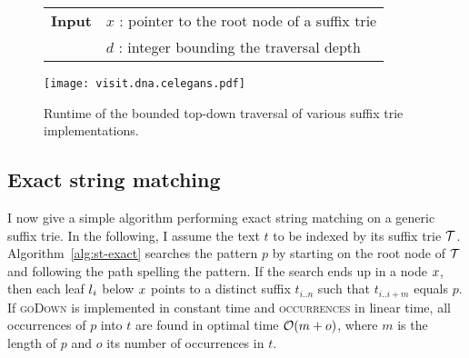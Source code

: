 \begin{figure*}[t]
\begin{center}
\begin{minipage}[t]{.7\textwidth}
\begin{algorithm}[H]
\begin{tabular}{ll}
\textbf{Input}  & $x$ : pointer to the root node of a suffix trie\\
 			    & $d$ : integer bounding the traversal depth\\
\end{tabular}
\begin{algorithmic}[1]
		\Repeat
			\State {}
		\Until {}
	\EndIf
\EndIf
\end{algorithmic}
\label{alg:st-dfs}
\end{algorithm}
\end{minipage}
\end{center}
\end{figure*}

\begin{figure}[b]
\begin{center}
\caption[Top-down traversal runtime]{Runtime of the bounded top-down traversal of various suffix trie implementations.}
\label{fig:visit-dna}
\texttt{[image: visit.dna.celegans.pdf]}
\end{center}
\end{figure}

\subsection{Exact string matching}
\label{sec:index:algo:exact}

I now give a simple algorithm performing exact string matching on a generic suffix trie.
In the following, I assume the text $t$ to be indexed by its suffix trie $\mathcal {T}$.
Algorithm~\ref{alg:st-exact} searches the pattern $p$ by starting on the root node of $\mathcal {T}$ and following the path spelling the pattern.
If the search ends up in a node $x$, then each leaf $l_i$ below $x$ points to a distinct suffix $t_{i..n}$ such that $t_{i..i+m}$ equals $p$.
If \textsc{goDown} is implemented in constant time and \textsc{occurrences} in linear time, all occurrences of $p$ into $t$ are found in optimal time $\mathcal{O}(m+o)$, where $m$ is the length of $p$ and $o$ its number of occurrences in $t$.

